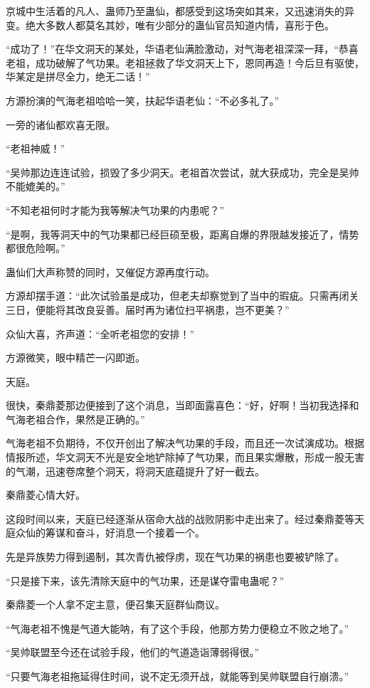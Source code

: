 \begin{this_body}
京城中生活着的凡人、蛊师乃至蛊仙，都感受到这场突如其来，又迅速消失的异变。绝大多数人都莫名其妙，唯有少部分的蛊仙官员知道内情，喜形于色。

“成功了！”在华文洞天的某处，华语老仙满脸激动，对气海老祖深深一拜，“恭喜老祖，成功破解了气功果。老祖拯救了华文洞天上下，恩同再造！今后旦有驱使，华某定是拼尽全力，绝无二话！”

方源扮演的气海老祖哈哈一笑，扶起华语老仙：“不必多礼了。”

一旁的诸仙都欢喜无限。

“老祖神威！”

“吴帅那边连连试验，损毁了多少洞天。老祖首次尝试，就大获成功，完全是吴帅不能媲美的。”

“不知老祖何时才能为我等解决气功果的内患呢？”

“是啊，我等洞天中的气功果都已经巨硕至极，距离自爆的界限越发接近了，情势都很危险啊。”

蛊仙们大声称赞的同时，又催促方源再度行动。

方源却摆手道：“此次试验虽是成功，但老夫却察觉到了当中的瑕疵。只需再闭关三日，便能将其改良妥善。届时再为诸位扫平祸患，岂不更美？”

众仙大喜，齐声道：“全听老祖您的安排！”

方源微笑，眼中精芒一闪即逝。

天庭。

很快，秦鼎菱那边便接到了这个消息，当即面露喜色：“好，好啊！当初我选择和气海老祖合作，果然是正确的。”

气海老祖不负期待，不仅开创出了解决气功果的手段，而且还一次试演成功。根据情报所述，华文洞天不光是安全地铲除掉了气功果，而且果实爆散，形成一股无害的气潮，迅速卷席整个洞天，将洞天底蕴提升了好一截去。

秦鼎菱心情大好。

这段时间以来，天庭已经逐渐从宿命大战的战败阴影中走出来了。经过秦鼎菱等天庭众仙的筹谋和奋斗，好消息一个接着一个。

先是异族势力得到遏制，其次青仇被俘虏，现在气功果的祸患也要被铲除了。

“只是接下来，该先清除天庭中的气功果，还是谋夺雷电蛊呢？”

秦鼎菱一个人拿不定主意，便召集天庭群仙商议。

“气海老祖不愧是气道大能呐，有了这个手段，他那方势力便稳立不败之地了。”

“吴帅联盟至今还在试验手段，他们的气道造诣薄弱得很。”

“只要气海老祖拖延得住时间，说不定无须开战，就能等到吴帅联盟自行崩溃。”


\end{this_body}
